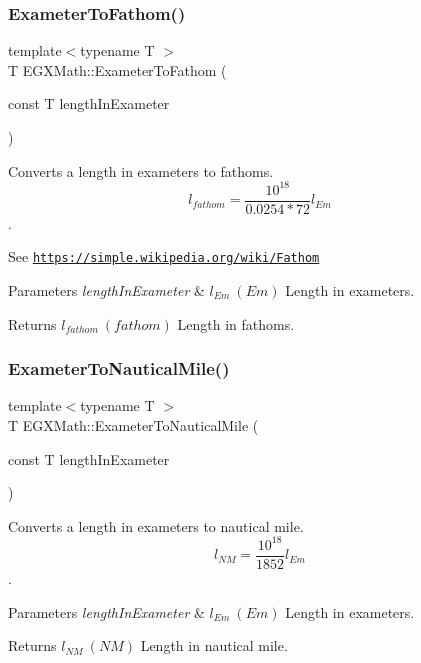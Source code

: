 \subsubsection{\texorpdfstring{Exameter\+To\+Fathom()}{ExameterToFathom()}}
{\footnotesize\ttfamily template$<$typename T $>$ \\
T E\+G\+X\+Math\+::\+Exameter\+To\+Fathom (\begin{DoxyParamCaption}\item[{const T}]{length\+In\+Exameter }\end{DoxyParamCaption})}



Converts a length in exameters to fathoms. \[ l_{fathom}= \frac{10^{18}}{0.0254 * 72} l_{Em} \]. 

See \href{https://simple.wikipedia.org/wiki/Fathom}{\tt https\+://simple.\+wikipedia.\+org/wiki/\+Fathom} 
\begin{DoxyParams}{Parameters}
{\em length\+In\+Exameter} & $ l_{Em}\ (Em)$ Length in exameters. \\
\hline
\end{DoxyParams}
\begin{DoxyReturn}{Returns}
$ l_{fathom}\ (fathom)$ Length in fathoms. 
\end{DoxyReturn}
\mbox{\label{group___e_g_x_math-_conversions-_length_conversions-_s_i-_exameter-_nautical_gaf593ae9d78bd889caca4e9249be1464a}} 
\subsubsection{\texorpdfstring{Exameter\+To\+Nautical\+Mile()}{ExameterToNauticalMile()}}
{\footnotesize\ttfamily template$<$typename T $>$ \\
T E\+G\+X\+Math\+::\+Exameter\+To\+Nautical\+Mile (\begin{DoxyParamCaption}\item[{const T}]{length\+In\+Exameter }\end{DoxyParamCaption})}



Converts a length in exameters to nautical mile. \[ l_{NM}= \frac{10^{18}}{1852} l_{Em} \]. 


\begin{DoxyParams}{Parameters}
{\em length\+In\+Exameter} & $ l_{Em}\ (Em)$ Length in exameters. \\
\hline
\end{DoxyParams}
\begin{DoxyReturn}{Returns}
$ l_{NM}\ (NM)$ Length in nautical mile. 
\end{DoxyReturn}
